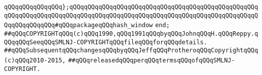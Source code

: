 \newline
\verb|qQQqqQQqqQQqqQQq};qQQqqQQqqQQqqQQqqQQqqQQqqQQqqQQqqQQqqQQqqQQqqQQqqQQqqQQqqQQqqQQqqQQqqQQqqQQqqQQqqQQqqQQqqQQqqQQqqQQqqQQqqQQqqQQqqQQqqQQqqQQqqQQqqQQqqQQq#qQQqpackageqQQqhash_window|\newline
\verb|end;|\newline
\newline
\verb|##qQQqCOPYRIGHTqQQq(c)qQQq1990,qQQq1991qQQqbyqQQqJohnqQQqH.qQQqReppy.qQQqqQQqSeeqQQqSMLNJ-COPYRIGHTqQQqfileqQQqforqQQqdetails.|\newline
\verb|##qQQqSubsequentqQQqchangesqQQqbyqQQqJeffqQQqProtheroqQQqCopyrightqQQq(c)qQQq2010-2015,|\newline
\verb|##qQQqreleasedqQQqperqQQqtermsqQQqofqQQqSMLNJ-COPYRIGHT.|\newline


